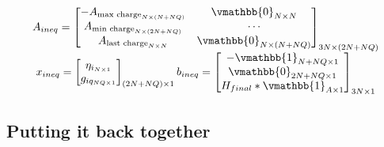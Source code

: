 \documentclass[letterpaper, 10pt, conference]{IEEEtran}
\begin{document}
\begin{equation}
\begin{array}{c}
    A_{ineq} =
    \begin{bmatrix}
	-A_{\textrm{max charge}_{N \times (N+NQ)}} & \vmathbb{0}_{N \times N}        \\
	A_{\textrm{min charge}_{N \times (2N+NQ)}} & \cdots                         \\
	A_{\textrm{last charge}_{N \times N}}      & \vmathbb{0}_{N \times (N + NQ)} \\
    \end{bmatrix}_{3N \times (2N + NQ)} \\
    x_{ineq} =
    \begin{bmatrix}
	\eta_{i_{N \times 1}} \\
	g_{iq_{NQ \times 1}} \\
    \end{bmatrix}_{(2N + NQ) \times 1}
    b_{ineq} =
    \begin{bmatrix}
	-\vmathbb{1}_{N + NQ \times 1} \\
	\vmathbb{0}_{2N + NQ \times 1} \\
	H_{final}*\vmathbb{1}_{A \times 1} \\
    \end{bmatrix}_{3N \times 1}
\end{array}
\end{equation}

\subsection{Putting it back together}\label{putting-it-back-together}
\end{document}
